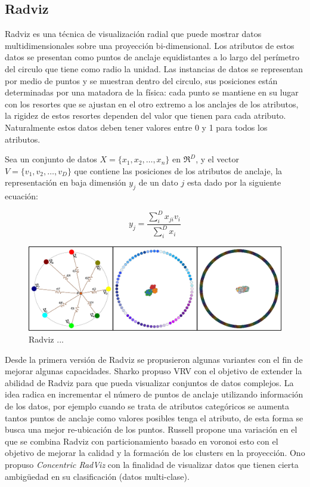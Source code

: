 \subsection{Radviz} 
Radviz \cite{hoffman1997radviz} es una técnica de visualización radial que puede mostrar datos multidimensionales sobre una proyección bi-dimensional. Los atributos de estos datos se presentan como puntos de anclaje equidistantes a lo largo del perímetro del circulo que tiene como radio la unidad. Las instancias de datos se representan por medio de puntos y se muestran dentro del circulo, sus posiciones están determinadas por una matadora de la física: cada punto se mantiene en su lugar con los resortes que se ajustan en el otro extremo a los anclajes de los atributos, la rigidez de estos resortes dependen del valor que tienen para cada atributo. Naturalmente estos datos deben tener valores entre 0 y 1 para todos los atributos. 
\begin{defn} 
Sea un conjunto de datos $X=\{x_1,x_2,\ldots,x_n\}$ en $\Re^D$, y el vector $V=\{v_1,v_2,\ldots,v_D\}$ que contiene las posiciones de los atributos de anclaje, la representación en baja dimensión $y_{j}$ de un dato $j$ esta dado por la siguiente ecuación:
\end{defn}
\begin{equation}
y_{j}=\frac{\sum_{i}^{D}{x_{ji}v_{i}}}{\sum_{i}^{D}{x_{i}}}
\end{equation}
\begin{figure}[!h]
\centering
\includegraphics[width=0.8\columnwidth]{figs/Radviz}%
\caption{Radviz ...}%
\label{fig:Radviz}%
\end{figure}

Desde la primera versión de Radviz se propusieron algunas variantes con el fin de mejorar algunas capacidades. Sharko propuso \ac{VRV} \cite{sharko2008vrv} con el objetivo de extender la abilidad de Radviz para que pueda visualizar conjuntos de datos complejos. La idea radica en incrementar el número de puntos de anclaje utilizando información de los datos, por ejemplo cuando se trata de atributos categóricos se aumenta tantos puntos de anclaje como valores posibles tenga el atributo, de esta forma se busca una mejor re-ubicación de los puntos. Russell \cite{russell2012voronoi_radviz} propone una variación en el que se combina Radviz con particionamiento basado en voronoi esto con el objetivo de mejorar la calidad  y la formación de los clusters en la proyección. Ono propuso \textit{Concentric RadViz} \cite{ono2015cradviz} con la finalidad de visualizar datos que tienen cierta ambigüedad en su clasificación (datos multi-clase).

